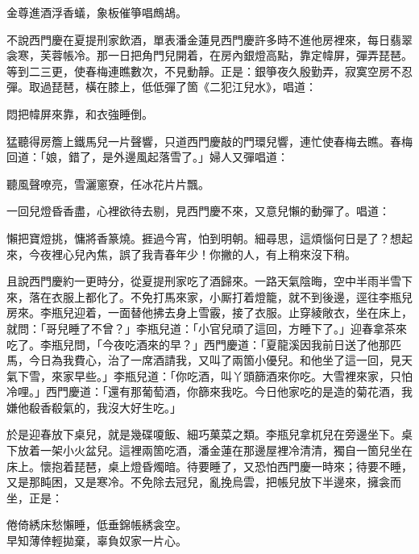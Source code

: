 \begin{myquote}
金尊進酒浮香蟻，象板催箏唱鷓鴣。
\end{myquote}

不說西門慶在夏提刑家飲酒，單表潘金蓮見西門慶許多時不進他房裡來，每日翡翠衾寒，芙蓉帳冷。那一日把角門兒開着，在房內銀燈高點，靠定幃屏，彈弄琵琶。等到二三更，使春梅連瞧數次，不見動靜。正是：銀箏夜久殷勤弄，寂寞空房不忍彈。取過琵琶，橫在膝上，低低彈了箇《二犯江兒水》，唱道：

\begin{myquote}
悶把幃屏來靠，和衣強睡倒。
\end{myquote}

猛聽得房簷上鐵馬兒一片聲響，只道西門慶敲的門環兒響，連忙使春梅去瞧。春梅回道：「娘，錯了，是外邊風起落雪了。」{}婦人又彈唱道：

\begin{myquote}
聽風聲嘹亮，雪灑窻寮，任冰花片片飄。
\end{myquote}

一回兒燈昏香盡，心裡欲待去剔，見西門慶不來，又意兒懶的動彈了。唱道：

\begin{myquote}
懶把寶燈挑，慵將香篆燒。捱過今宵，怕到明朝。細尋思，這煩惱何日是了？想起來，今夜裡心兒內焦，誤了我青春年少！你撇的人，有上稍來沒下稍。
\end{myquote}

且說西門慶約一更時分，從夏提刑家吃了酒歸來。一路天氣陰晦，空中半雨半雪下來，落在衣服上都化了。不免打馬來家，小厮打着燈籠，就不到後邊，逕往李瓶兒房來。李瓶兒迎着，一面替他拂去身上雪霰，接了衣服。止穿綾敞衣，坐在床上，就問：「哥兒睡了不曾？」李瓶兒道：「小官兒頑了這回，方睡下了。」迎春拿茶來吃了。李瓶兒問，「今夜吃酒來的早？」西門慶道：「夏龍溪因我前日送了他那匹馬，今日為我費心，治了一席酒請我，又叫了兩箇小優兒。和他坐了這一回，見天氣下雪，來家早些。」李瓶兒道：「你吃酒，叫丫頭篩酒來你吃。大雪裡來家，只怕冷哩。」西門慶道：「還有那葡萄酒，你篩來我吃。今日他家吃的是造的菊花酒，我嫌他殽香殽氣的，我沒大好生吃。」

於是迎春放下桌兒，就是幾碟嗄飯、細巧菓菜之類。李瓶兒拿杌兒在旁邊坐下。桌下放着一架小火盆兒。這裡兩箇吃酒，潘金蓮在那邊屋裡冷清清，獨自一箇兒坐在床上。懷抱着琵琶，桌上燈昏燭暗。待要睡了，又恐怕西門慶一時來；待要不睡，又是那盹困，又是寒冷。不免除去冠兒，亂挽烏雲，把帳兒放下半邊來，擁衾而坐，正是：

\begin{myquote}
倦倚綉床愁懶睡，低垂錦帳綉衾空。\\早知薄倖輕拋棄，辜負奴家一片心。
\end{myquote}

